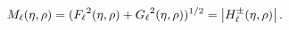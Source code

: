 \[\mathop{M_{\ell}\/}\nolimits\!\left(\eta,\rho\right)=({\mathop{F_{\ell}\/}%
\nolimits^{2}}\!\left(\eta,\rho\right)+{\mathop{G_{\ell}\/}\nolimits^{2}}\!%
\left(\eta,\rho\right))^{1/2}=\left|\mathop{{H^{\pm}_{\ell}}\/}\nolimits\!%
\left(\eta,\rho\right)\right|.\]